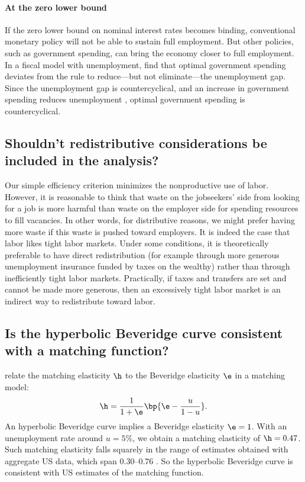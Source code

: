 \documentclass[letterpaper,12pt,leqno]{article}
\begin{document}
\paragraph{At the zero lower bound} If the zero lower bound on nominal interest rates becomes binding, conventional monetary policy will not be able to sustain full employment. But other policies, such as government spending, can bring the economy closer to full employment. In a fiscal model with unemployment, \citet{MS15} find that optimal government spending deviates from the \citet{S54} rule to reduce---but not eliminate---the unemployment gap. Since the unemployment gap is countercyclical, and an increase in government spending reduces unemployment \citep{Ra13}, optimal government spending is countercyclical.

\subsection{Shouldn't redistributive considerations be included in the analysis?}

Our simple efficiency criterion minimizes the nonproductive use of labor. However, it is reasonable to think that waste on the jobseekers' side from looking for a job is more harmful than waste on the employer side for spending resources to fill vacancies. In other words, for distributive reasons, we might prefer having more waste if this waste is pushed toward employers. It is indeed the case that labor likes tight labor markets. Under some conditions, it is theoretically preferable to have direct redistribution (for example through more generous unemployment insurance funded by taxes on the wealthy) rather than through inefficiently tight labor markets. Practically, if taxes and transfers are set and cannot be made more generous, then an excessively tight labor market is an indirect way to redistribute toward labor.

\subsection{Is the hyperbolic Beveridge curve consistent with a matching function?}

\citet[equation (A12)]{MS16} relate the matching elasticity $\h$ to the Beveridge elasticity $\e$ in a matching model:
\begin{equation*}
\h = \frac{1}{1+\e}\bp{\e-\frac{u}{1-u}}.
\end{equation*}
An hyperbolic Beveridge curve implies a Beveridge elasticity $\e=1$. With an unemployment rate around $u=5\%$, we obtain a matching elasticity of $\h = 0.47$. Such matching elasticity falls squarely in the range of estimates obtained with aggregate US data, which span $0.30$--$0.76$ \citet[p. 9]{MS16}. So the hyperbolic Beveridge curve is consistent with US estimates of the matching function.
\end{document}
